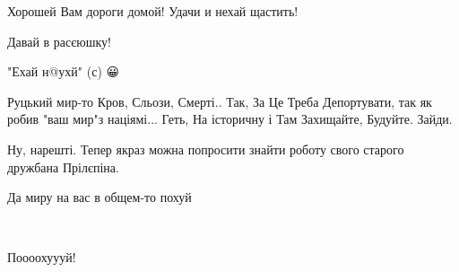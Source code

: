 \begin{itemize}
Хорошей Вам дороги домой! Удачи и нехай щастить!

 
Давай в расєюшку!

 
"Ехай н@ухй" (с) 😀

 
Руцький мир-то Кров, Сльози, Смерті.. Так, За Це Треба Депортувати, так як робив "ваш мир"з націямі... Геть, На історичну і Там Захищайте, Будуйте. Зайди.

 
Ну, нарешті.
Тепер якраз можна попросити знайти роботу свого старого дружбана Прілєпіна.

 
Да миру на вас в общем-то похуй

 
👏👏👏👏

 
Поооохуууй!


\end{itemize}
